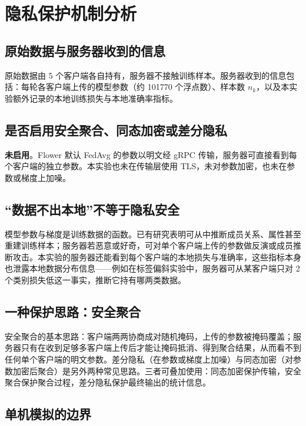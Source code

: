 \documentclass{SYSUReport}
\begin{document}
\section{隐私保护机制分析}

\subsection{原始数据与服务器收到的信息}

原始数据由 5 个客户端各自持有，服务器不接触训练样本。服务器收到的信息包括：每轮各客户端上传的模型参数（约 101770 个浮点数）、样本数 $n_k$，以及本实验额外记录的本地训练损失与本地准确率指标。

\subsection{是否启用安全聚合、同态加密或差分隐私}

\textbf{未启用}。Flower 默认 FedAvg 的参数以明文经 gRPC 传输，服务器可直接看到每个客户端的独立参数。本实验也未在传输层使用 TLS，未对参数加密，也未在参数或梯度上加噪。

\subsection{“数据不出本地”不等于隐私安全}

模型参数与梯度是训练数据的函数。已有研究表明可从中推断成员关系、属性甚至重建训练样本；服务器若恶意或好奇，可对单个客户端上传的参数做反演或成员推断攻击。本实验的服务器还能看到每个客户端的本地损失与准确率，这些指标本身也泄露本地数据分布信息——例如在标签偏斜实验中，服务器可从某客户端只对 2 个类别损失低这一事实，推断它持有哪两类数据。

\subsection{一种保护思路：安全聚合}

安全聚合的基本思路：客户端两两协商成对随机掩码，上传的参数被掩码覆盖；服务器只有在收到足够多客户端上传后才能让掩码抵消、得到聚合结果，从而看不到任何单个客户端的明文参数。差分隐私（在参数或梯度上加噪）与同态加密（对参数加密后聚合）是另外两种常见思路。三者可叠加使用：同态加密保护传输，安全聚合保护聚合过程，差分隐私保护最终输出的统计信息。

\subsection{单机模拟的边界}
\end{document}
